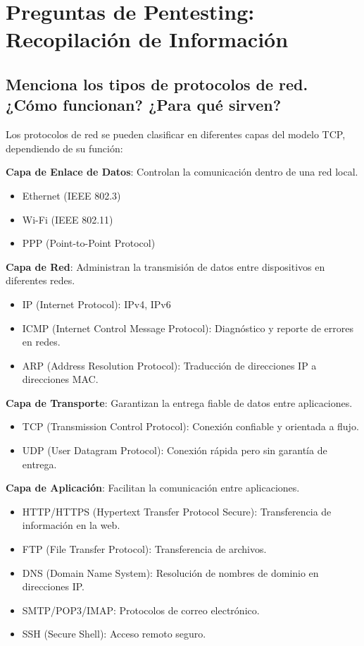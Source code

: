 \section{Preguntas de Pentesting: Recopilación de Información}

\subsection{Menciona los tipos de protocolos de red. ¿Cómo funcionan? ¿Para qué sirven?}
Los protocolos de red se pueden clasificar en diferentes capas del modelo TCP, dependiendo de su función:

\textbf{Capa de Enlace de Datos}: Controlan la comunicación dentro de una red local.
\begin{itemize}
    \item Ethernet (IEEE 802.3)
    \item Wi-Fi (IEEE 802.11)
    \item PPP (Point-to-Point Protocol)
\end{itemize}

\textbf{Capa de Red}: Administran la transmisión de datos entre dispositivos en diferentes redes.
\begin{itemize}
    \item IP (Internet Protocol): IPv4, IPv6
    \item ICMP (Internet Control Message Protocol): Diagnóstico y reporte de errores en redes.
    \item ARP (Address Resolution Protocol): Traducción de direcciones IP a direcciones MAC.
\end{itemize}

\textbf{Capa de Transporte}: Garantizan la entrega fiable de datos entre aplicaciones.
\begin{itemize}
    \item TCP (Transmission Control Protocol): Conexión confiable y orientada a flujo.
    \item UDP (User Datagram Protocol): Conexión rápida pero sin garantía de entrega.
\end{itemize}

\textbf{Capa de Aplicación}: Facilitan la comunicación entre aplicaciones.
\begin{itemize}
    \item HTTP/HTTPS (Hypertext Transfer Protocol Secure): Transferencia de información en la web.
    \item FTP (File Transfer Protocol): Transferencia de archivos.
    \item DNS (Domain Name System): Resolución de nombres de dominio en direcciones IP.
    \item SMTP/POP3/IMAP: Protocolos de correo electrónico.
    \item SSH (Secure Shell): Acceso remoto seguro.
\end{itemize}

